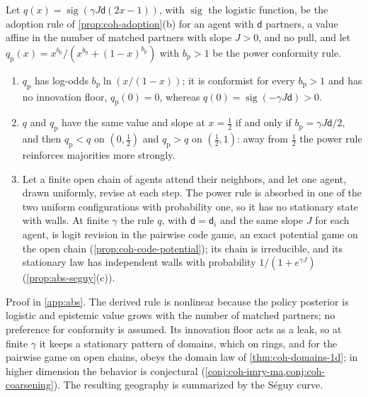 \begin{proposition}\label{prop:abs-conformity}
Let $q(x)=\operatorname{sig}(\gamma J\mathsf d(2x-1))$, with $\operatorname{sig}$ the logistic function, be the adoption rule of \cref{prop:coh-adoption}(b) for an agent with $\mathsf d$ partners, a value affine in the number of matched partners with slope $J>0$, and no pull, and let $q_{\mathrm p}(x)=x^{b_{\mathrm p}}/(x^{b_{\mathrm p}}+(1-x)^{b_{\mathrm p}})$ with $b_{\mathrm p}>1$ be the power conformity rule.
\begin{enumerate}
\item[(a)] $q_{\mathrm p}$ has log-odds $b_{\mathrm p}\ln(x/(1-x))$; it is conformist for every $b_{\mathrm p}>1$ and has no innovation floor, $q_{\mathrm p}(0)=0$, whereas $q(0)=\operatorname{sig}(-\gamma J\mathsf d)>0$.
\item[(b)] $q$ and $q_{\mathrm p}$ have the same value and slope at $x=\frac12$ if and only if $b_{\mathrm p}=\gamma J\mathsf d/2$, and then $q_{\mathrm p}<q$ on $(0,\frac12)$ and $q_{\mathrm p}>q$ on $(\frac12,1)$: away from $\frac12$ the power rule reinforces majorities more strongly.
\item[(c)] Let a finite open chain of agents attend their neighbors, and let one agent, drawn uniformly, revise at each step. The power rule is absorbed in one of the two uniform configurations with probability one, so it has no stationary state with walls. At finite $\gamma$ the rule $q$, with $\mathsf d=\mathsf d_i$ and the same slope $J$ for each agent, is logit revision in the pairwise code game, an exact potential game on the open chain (\cref{prop:coh-code-potential}); its chain is irreducible, and its stationary law has independent walls with probability $1/(1+e^{\gamma J})$ (\cref{prop:abs-seguy}(c)).
\end{enumerate}
\end{proposition}

Proof in \cref{app:abs}. The derived rule is nonlinear because the policy posterior is logistic and epistemic value grows with the number of matched partners; no preference for conformity is assumed. Its innovation floor acts as a leak, so at finite $\gamma$ it keeps a stationary pattern of domains, which on rings, and for the pairwise game on open chains, obeys the domain law of \cref{thm:coh-domains-1d}; in higher dimension the behavior is conjectural (\cref{conj:coh-imry-ma,conj:coh-coarsening}). The resulting geography is summarized by the S\'eguy curve.

